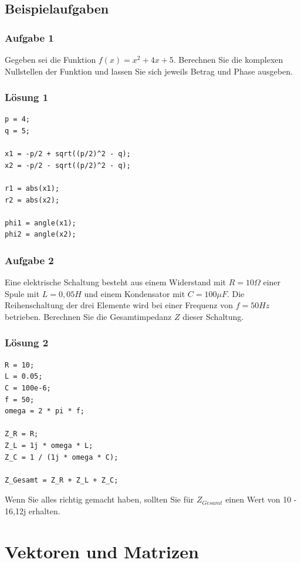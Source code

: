 \documentclass[12pt, a4paper, twoside]{article}
\begin{document}
        \subsection{Beispielaufgaben}
                \subsubsection*{Aufgabe 1}
                Gegeben sei die Funktion $f(x) = x^2 +4x +5$. Berechnen Sie die komplexen Nullstellen der Funktion und lassen Sie sich jeweils Betrag und Phase ausgeben.
                \subsubsection*{Lösung 1}
                \begin{lstlisting}
p = 4;
q = 5;

x1 = -p/2 + sqrt((p/2)^2 - q);
x2 = -p/2 - sqrt((p/2)^2 - q);

r1 = abs(x1);
r2 = abs(x2);

phi1 = angle(x1);
phi2 = angle(x2);

                \end{lstlisting}
                \subsubsection*{Aufgabe 2}
                Eine elektrische Schaltung besteht aus einem Widerstand mit $R=10\Omega$ einer Spule mit $L=0,05H$ und einem Kondensator mit $C=100\mu F$. Die Reihenschaltung der drei Elemente wird bei einer Frequenz von $f=50Hz$ betrieben. Berechnen Sie die Gesamtimpedanz $Z$ dieser Schaltung.
                \subsubsection*{Lösung 2}
                \begin{lstlisting}
R = 10;
L = 0.05;
C = 100e-6;
f = 50;
omega = 2 * pi * f;

Z_R = R;
Z_L = 1j * omega * L;
Z_C = 1 / (1j * omega * C);

Z_Gesamt = Z_R + Z_L + Z_C;
                \end{lstlisting}
                \noindent Wenn Sie alles richtig gemacht haben, sollten Sie für $Z_{Gesamt}$ einen Wert von 10 - 16,12j erhalten.
                
    \section{Vektoren und Matrizen}
\end{document}
